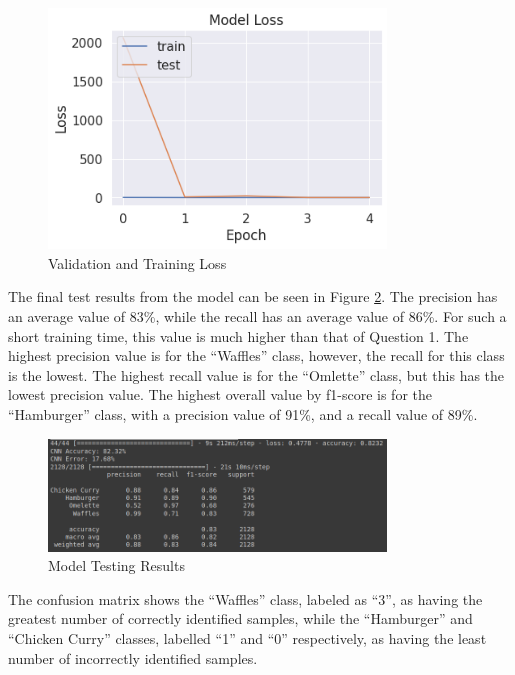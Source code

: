 \begin{figure}[H]
	\centering
	\includegraphics[width=0.8\textwidth]{images/q2/loss}
	\caption{Validation and Training Loss}
	\label{fig:q2loss}
\end{figure}

The final test results from the model can be seen in Figure
\ref{fig:q2results}. The precision has an average value of 83\%, while the
recall has an average value of 86\%. For such a short training time, this value
is much higher than that of Question 1. The highest precision value is for the
``Waffles'' class, however, the recall for this class is the lowest. The highest
recall value is for the ``Omlette'' class, but this has the lowest
precision value. The highest overall value by f1-score is for the ``Hamburger''
class, with a precision value of 91\%, and a recall value of 89\%.

\begin{figure}[H]
	\centering
	\includegraphics[width=0.8\textwidth]{images/q2/results}
	\caption{Model Testing Results}
	\label{fig:q2results}
\end{figure}

The confusion matrix shows the ``Waffles'' class, labeled as ``3'', as having
the
greatest number of correctly identified samples, while the ``Hamburger'' and
``Chicken Curry'' classes,
labelled ``1'' and ``0'' respectively, as having the least number of
incorrectly identified samples.

